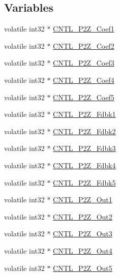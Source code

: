 \subsection*{Variables}
\begin{DoxyCompactItemize}
\item 
volatile int32 $\ast$ \hyperlink{a00009_a047c759a71b80d8cfd5e6f52b1b021b9}{C\-N\-T\-L\-\_\-P2\-Z\-\_\-\-Coef1}
\item 
volatile int32 $\ast$ \hyperlink{a00009_abdc599cbabc62898c49926678c3327e6}{C\-N\-T\-L\-\_\-P2\-Z\-\_\-\-Coef2}
\item 
volatile int32 $\ast$ \hyperlink{a00009_a1e357d296e76299ea04d7a63e4c46d1b}{C\-N\-T\-L\-\_\-P2\-Z\-\_\-\-Coef3}
\item 
volatile int32 $\ast$ \hyperlink{a00009_afe468cb1e995b267671e88b8d292aef6}{C\-N\-T\-L\-\_\-P2\-Z\-\_\-\-Coef4}
\item 
volatile int32 $\ast$ \hyperlink{a00009_a5fe3f4dd6aac27512c9e0b6fc843b0b6}{C\-N\-T\-L\-\_\-P2\-Z\-\_\-\-Coef5}
\item 
volatile int32 $\ast$ \hyperlink{a00009_a9c0418a780375035750c3d4dc16f3ae4}{C\-N\-T\-L\-\_\-P2\-Z\-\_\-\-Fdbk1}
\item 
volatile int32 $\ast$ \hyperlink{a00009_a6092ef1c1c54802bb5e11564f782390d}{C\-N\-T\-L\-\_\-P2\-Z\-\_\-\-Fdbk2}
\item 
volatile int32 $\ast$ \hyperlink{a00009_a939782d23ddbf7f45e5e393a65bafcff}{C\-N\-T\-L\-\_\-P2\-Z\-\_\-\-Fdbk3}
\item 
volatile int32 $\ast$ \hyperlink{a00009_a6937e965f3ae840ea6ee43cce410680f}{C\-N\-T\-L\-\_\-P2\-Z\-\_\-\-Fdbk4}
\item 
volatile int32 $\ast$ \hyperlink{a00009_af5cbb635f31bbebd041e8543deb40dee}{C\-N\-T\-L\-\_\-P2\-Z\-\_\-\-Fdbk5}
\item 
volatile int32 $\ast$ \hyperlink{a00009_a84d7c096ca668d1edc5e4fa54abe5d98}{C\-N\-T\-L\-\_\-P2\-Z\-\_\-\-Out1}
\item 
volatile int32 $\ast$ \hyperlink{a00009_ae6679b66ffeca93742f973a2c947855f}{C\-N\-T\-L\-\_\-P2\-Z\-\_\-\-Out2}
\item 
volatile int32 $\ast$ \hyperlink{a00009_a11dcb9f6b6d03fe960ddf790e1ad5ed2}{C\-N\-T\-L\-\_\-P2\-Z\-\_\-\-Out3}
\item 
volatile int32 $\ast$ \hyperlink{a00009_a253e4070b19470606e0566ff25fc911f}{C\-N\-T\-L\-\_\-P2\-Z\-\_\-\-Out4}
\item 
volatile int32 $\ast$ \hyperlink{a00009_a3b336a91d25a7feb9f8927b32b800d0d}{C\-N\-T\-L\-\_\-P2\-Z\-\_\-\-Out5}

\end{DoxyCompactItemize}
